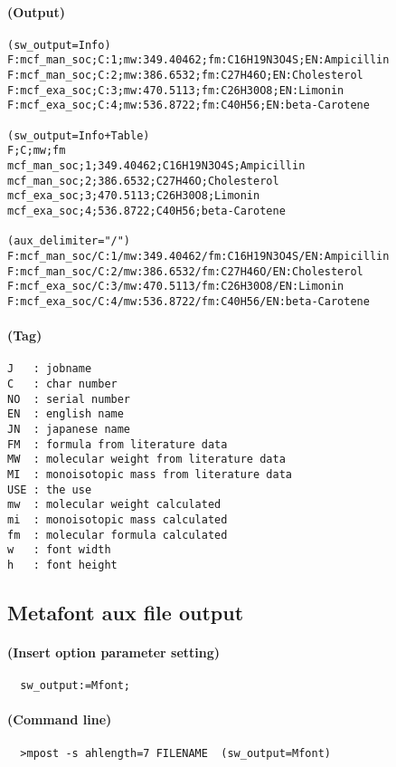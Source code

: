 \documentclass[a4paper]{article}
\begin{document}
\paragraph{(Output)}
%
\begin{verbatim}
(sw_output=Info)
F:mcf_man_soc;C:1;mw:349.40462;fm:C16H19N3O4S;EN:Ampicillin
F:mcf_man_soc;C:2;mw:386.6532;fm:C27H46O;EN:Cholesterol
F:mcf_exa_soc;C:3;mw:470.5113;fm:C26H30O8;EN:Limonin
F:mcf_exa_soc;C:4;mw:536.8722;fm:C40H56;EN:beta-Carotene

(sw_output=Info+Table)
F;C;mw;fm
mcf_man_soc;1;349.40462;C16H19N3O4S;Ampicillin
mcf_man_soc;2;386.6532;C27H46O;Cholesterol
mcf_exa_soc;3;470.5113;C26H30O8;Limonin
mcf_exa_soc;4;536.8722;C40H56;beta-Carotene

(aux_delimiter="/")
F:mcf_man_soc/C:1/mw:349.40462/fm:C16H19N3O4S/EN:Ampicillin
F:mcf_man_soc/C:2/mw:386.6532/fm:C27H46O/EN:Cholesterol
F:mcf_exa_soc/C:3/mw:470.5113/fm:C26H30O8/EN:Limonin
F:mcf_exa_soc/C:4/mw:536.8722/fm:C40H56/EN:beta-Carotene
\end{verbatim}
\paragraph{(Tag)}
\begin{verbatim}
J   : jobname                           
C   : char number
NO  : serial number
EN  : english name
JN  : japanese name
FM  : formula from literature data
MW  : molecular weight from literature data
MI  : monoisotopic mass from literature data
USE : the use
mw  : molecular weight calculated
mi  : monoisotopic mass calculated
fm  : molecular formula calculated
w   : font width
h   : font height
\end{verbatim}
\noindent%
\newpage
\subsection{Metafont aux file output}
%
\paragraph{(Insert option parameter setting)}
\begin{verbatim}
  sw_output:=Mfont;
\end{verbatim}
\paragraph{(Command line)}
\begin{verbatim}
  >mpost -s ahlength=7 FILENAME  (sw_output=Mfont)
\end{verbatim}
\end{document}
